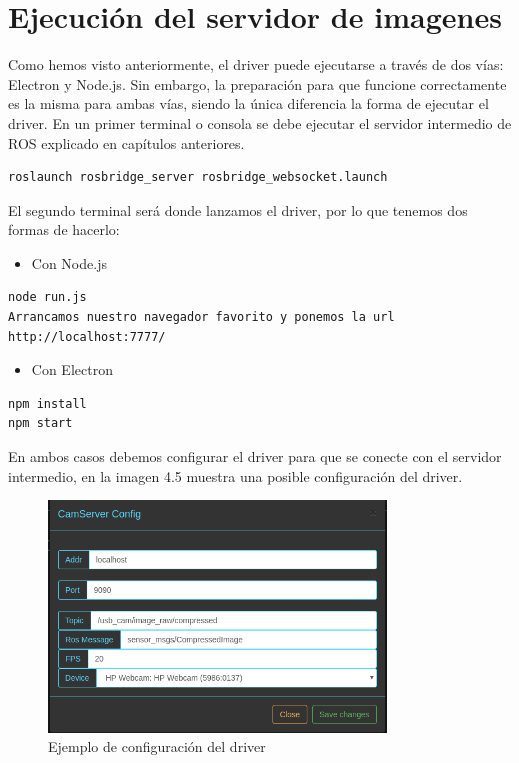 \section{Ejecución del servidor de imagenes}
Como hemos visto anteriormente, el driver puede ejecutarse a través de dos vías: Electron y Node.js. Sin embargo, la preparación para que funcione correctamente es la misma para ambas vías, siendo la única diferencia la forma de ejecutar el driver.
En un primer terminal o consola se debe ejecutar el servidor intermedio de ROS explicado en capítulos anteriores.
\begin{lstlisting}[frame=single]
roslaunch rosbridge_server rosbridge_websocket.launch
\end{lstlisting}
El segundo terminal será donde lanzamos el driver, por lo que tenemos dos formas de hacerlo:
\begin{itemize}
\item 
Con Node.js
\end{itemize}
\begin{lstlisting}[frame=single]
node run.js
Arrancamos nuestro navegador favorito y ponemos la url http://localhost:7777/
\end{lstlisting}
\begin{itemize}
\item 
Con Electron
\end{itemize}
\begin{lstlisting}[frame=single]
npm install
npm start
\end{lstlisting}
En ambos casos debemos configurar el driver para que se conecte con el servidor intermedio, en la imagen 4.5 muestra una posible configuración del driver.
\begin{figure}[H]
  \begin{center}
    \includegraphics[width=0.8\textwidth]{figures/configcamservertest.png}
		\caption{Ejemplo de configuración del driver}
		\label{fig.esquemacamserver}
		\end{center}
\end{figure}
